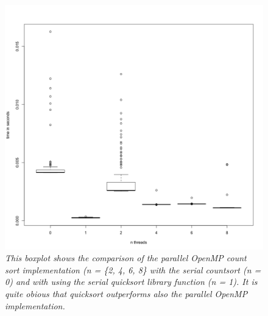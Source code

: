 \documentclass[a4paper,11pt,twoside]{article}
\begin{document}
\begin{figure}

  \centering
  \includegraphics[width=1\textwidth]{countsort.png}
  \caption{\textit{This boxplot shows the comparison of the parallel OpenMP count sort implementation (n = \{2, 4, 6, 8\} with the serial countsort (n = 0) and with using the serial quicksort library function (n = 1). It is quite obious that quicksort outperforms also the parallel OpenMP implementation.}}
  \label{fig:countsort}
\end{figure}
\end{document}

